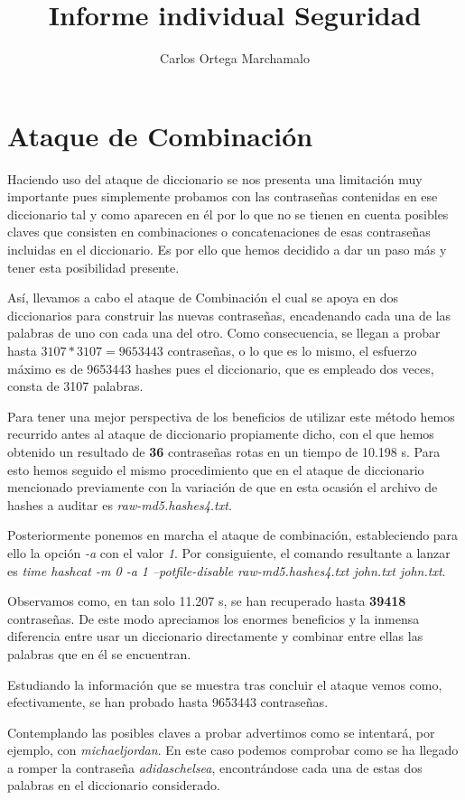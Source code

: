\documentclass{article}
\title{Informe individual Seguridad}
\author{Carlos Ortega Marchamalo}
\date{}
\begin{document}
	\maketitle

		\section{Ataque de Combinación}
			Haciendo uso del ataque de diccionario se nos presenta una limitación muy importante pues simplemente probamos con las contraseñas contenidas en ese diccionario tal y como aparecen en él por lo que no se tienen en cuenta posibles claves que consisten en combinaciones o concatenaciones de esas contraseñas incluidas en el diccionario. Es por ello que hemos decidido a dar un paso más y tener esta posibilidad presente.

			Así, llevamos a cabo el ataque de Combinación el cual se apoya en dos diccionarios para construir las nuevas contraseñas, encadenando cada una de las palabras de uno con cada una del otro. Como consecuencia, se llegan a probar hasta $3107 * 3107 = 9653443$ contraseñas, o lo que es lo mismo, el esfuerzo máximo es de 9653443 hashes pues el diccionario, que es empleado dos veces, consta de 3107 palabras.

			Para tener una mejor perspectiva de los beneficios de utilizar este método hemos recurrido antes al ataque de diccionario propiamente dicho, con el que hemos obtenido un resultado de \textbf{36} contraseñas rotas en un tiempo de 10.198 s. Para esto hemos seguido el mismo procedimiento que en el ataque de diccionario mencionado previamente con la variación de que en esta ocasión el archivo de hashes a auditar es \textit{raw-md5.hashes4.txt}.

			Posteriormente ponemos en marcha el ataque de combinación, estableciendo para ello la opción \textit{-a} con el valor \textit{1}. Por consiguiente, el comando resultante a lanzar es \textit{time hashcat -m 0 -a 1 --potfile-disable raw-md5.hashes4.txt john.txt john.txt}.

			Observamos como, en tan solo 11.207 s, se han recuperado hasta \textbf{39418} contraseñas. De este modo apreciamos los enormes beneficios y la inmensa diferencia entre usar un diccionario directamente y combinar entre ellas las palabras que en él se encuentran.

			Estudiando la información que se muestra tras concluir el ataque vemos como, efectivamente, se han probado hasta 9653443 contraseñas.

			Contemplando las posibles claves a probar advertimos como se intentará, por ejemplo, con \textit{michaeljordan}. En este caso podemos comprobar como se ha llegado a romper la contraseña \textit{adidaschelsea}, encontrándose cada una de estas dos palabras en el diccionario considerado.
\end{document}

